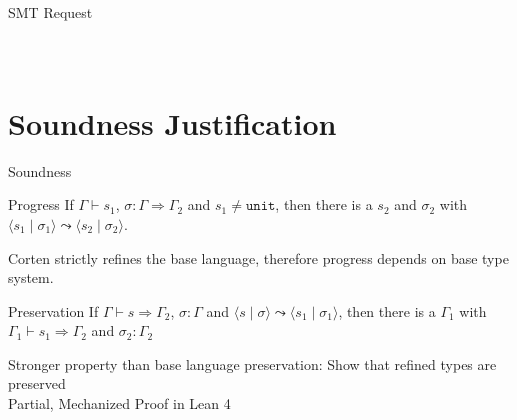 \documentclass{sdqbeamer}
\newcommand{\code}[1]{\texttt{#1}}
\newcommand{\tuple}[2]{\langle #1 \mid #2 \rangle}
\begin{document}
\begin{frame}{SMT Request}
  \begin{columns}
    \inputminted[mathescape=false, fontsize=\scriptsize, lastline=17]{lisp}{./snippets/smt.lisp}

    \inputminted[mathescape=false, fontsize=\scriptsize, firstline=18]{lisp}{./snippets/smt.lisp}
  \end{columns}
\end{frame}

\section{Soundness Justification}

\begin{frame}[fragile]{Soundness}
  \begin{greenblock}{Progress}
    If $\Gamma \vdash s_1$, $\sigma : \Gamma \Rightarrow \Gamma_2$ and $s_1 \neq \code{unit}$, then there is a $s_2$ and $\sigma_2$ with $\tuple{s_1}{\sigma_1} \leadsto \tuple{s_2}{\sigma_2}$.
  \end{greenblock}

  Corten strictly refines the base language, therefore progress depends on base type system.

  \begin{greenblock}{Preservation}
    If $\Gamma \vdash s \Rightarrow \Gamma_2$, $\sigma : \Gamma$ and $\tuple{s}{\sigma} \leadsto \tuple{s_1}{\sigma_1}$, then there is a $\Gamma_1$ with $\Gamma_1 \vdash s_1 \Rightarrow \Gamma_2$ and $\sigma_2 : \Gamma_2$
  \end{greenblock}

  Stronger property than base language preservation: Show that refined types are preserved\\
  
  Partial, Mechanized Proof in Lean 4
\end{frame}
\end{document}
